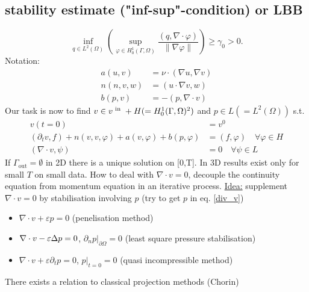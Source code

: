 \subsection{stability estimate ("inf-sup"-condition) or LBB}
\begin{equation*}
	\inf_{q \in L^2(\Omega)} \left(  \sup_{\varphi \in H^1_0(\Gamma,\Omega)} \frac{(q,\nabla \cdot \varphi )}{\|\nabla\varphi\|} \right) \geq \gamma_0 > 0.
\end{equation*}
Notation:
\begin{align*}
	a(u,v) &= \nu \cdot (\nabla u, \nabla v)\\
	n(n,v,w)&= (u \cdot \nabla v, w)\\
	b(p,v)&= -(p,\nabla\cdot v)
\end{align*}
Our task is now to find $v \in v^{\text{ in }} + H(=H^1_0(\Gamma,\Omega)^2)$ and $p \in L(=L^2(\Omega))$ s.t. 
\begin{align}
	v(t=0) &= v^0 \nonumber\\
	(\partial_tv,f) + n(v,v,\varphi) + a(v,\varphi) + b(p,\varphi) &= (f,\varphi)\quad \forall \varphi \in H\nonumber\\
	(\nabla \cdot v, \psi) &= 0 \quad \forall \psi \in L \label{div_v}
\end{align}
If $\Gamma_{\text{out}} = \emptyset $ in 2D there is a unique solution on [0,T]. In 3D results exist only for small $T$ on small data. How to deal with $\nabla\cdot v= 0$, decouple the continuity equation from momentum equation in an iterative process.\nl
\underline{Idea:} supplement $\nabla \cdot v =0$ by stabilisation involving $p$ (try to get $p$ in eq. \eqref{div_v})
\begin{itemize}
	\item $\nabla \cdot v + \varepsilon p =0$ (penelisation method)
	\item $\nabla \cdot v - \varepsilon\Delta p =0$, $\partial_n p|_{\partial\Omega}=0$ (least square pressure stabilisation)
	\item $\nabla \cdot v + \varepsilon \partial_t p =0$, $p|_{t=0}=0$ (quasi incompressible method)
\end{itemize}
There exists a relation to classical projection methods (Chorin)
